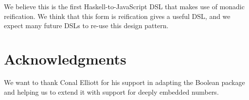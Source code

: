 \documentclass{llncs}
\begin{document}
We believe this is the first Haskell-to-JavaScript DSL that 
makes use of monadic reification. We think that this form
is reification gives a useful DSL, and we expect many future
DSLs to re-use this design pattern.

%

\section{Acknowledgments}

We want to thank Conal Elliott for his support in adapting 
the Boolean package \cite{project:boolean} and helping us to
extend it with support for deeply embedded numbers.

%
%


\vspace{-0.5cm} %
\end{document}
